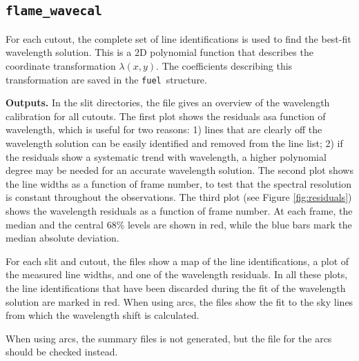 \documentclass[a4paper]{article}
\newcommand{\fuel}{\texttt{fuel}}
\begin{document}
\begin{sloppypar}
\subsection{\texttt{flame\_wavecal}}
\label{sec:wavecal}

For each cutout, the complete set of line identifications is used to find the best-fit wavelength solution. This is a 2D polynomial function that describes the coordinate transformation $\lambda(x,y)$. The coefficients describing this transformation are saved in the \fuel\ structure.

\medskip
\noindent
\textbf{Outputs.} In the slit directories, the file  gives an overview of the wavelength calibration for all cutouts. The first plot shows the residuals asa function of wavelength, which is useful for two reasons: 1) lines that are clearly off the wavelength solution can be easily identified and removed from the line list; 2) if the residuals show a systematic trend with wavelength, a higher polynomial degree may be needed for an accurate wavelength solution. The second plot shows the line widths as a function of frame number, to test that the spectral resolution is constant throughout the observations. The third plot (see Figure \ref{fig:residuals}) shows the wavelength residuals as a function of frame number. At each frame, the median and the central 68\% levels are shown in red, while the blue bars mark the median absolute deviation.

For each slit and cutout, the  files show a map of the line identifications, a plot of the measured line widths, and one of the wavelength residuals. In all these plots, the line identifications that have been discarded during the fit of the wavelength solution are marked in red. When using arcs, the  files show the fit to the sky lines from which the wavelength shift is calculated.

When using arcs, the summary files is not generated, but the  file for the arcs should be checked instead.


\end{sloppypar}
\end{document}

